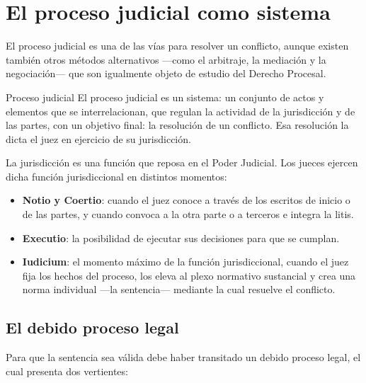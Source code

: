 \documentclass[12pt,oneside]{book}
\begin{document}
\tableofcontents
\clearpage

\chapter{El proceso judicial como sistema}

El proceso judicial es una de las vías para resolver un conflicto, aunque existen también otros métodos alternativos —como el arbitraje, la mediación y la negociación— que son igualmente objeto de estudio del Derecho Procesal.

\begin{definition}{Proceso judicial}
El proceso judicial es un sistema: un conjunto de actos y elementos que se interrelacionan, que regulan la actividad de la jurisdicción y de las partes, con un objetivo final: la resolución de un conflicto. Esa resolución la dicta el juez en ejercicio de su jurisdicción.
\end{definition}

La jurisdicción es una función que reposa en el Poder Judicial. Los jueces ejercen dicha función jurisdiccional en distintos momentos:

\begin{itemize}
    \item \textbf{Notio y Coertio}: cuando el juez conoce a través de los escritos de inicio o de las partes, y cuando convoca a la otra parte o a terceros e integra la litis.
    \item \textbf{Executio}: la posibilidad de ejecutar sus decisiones para que se cumplan.
    \item \textbf{Iudicium}: el momento máximo de la función jurisdiccional, cuando el juez fija los hechos del proceso, los eleva al plexo normativo sustancial y crea una norma individual —la sentencia— mediante la cual resuelve el conflicto.
\end{itemize}

\section{El debido proceso legal}

Para que la sentencia sea válida debe haber transitado un debido proceso legal, el cual presenta dos vertientes:
\end{document}
